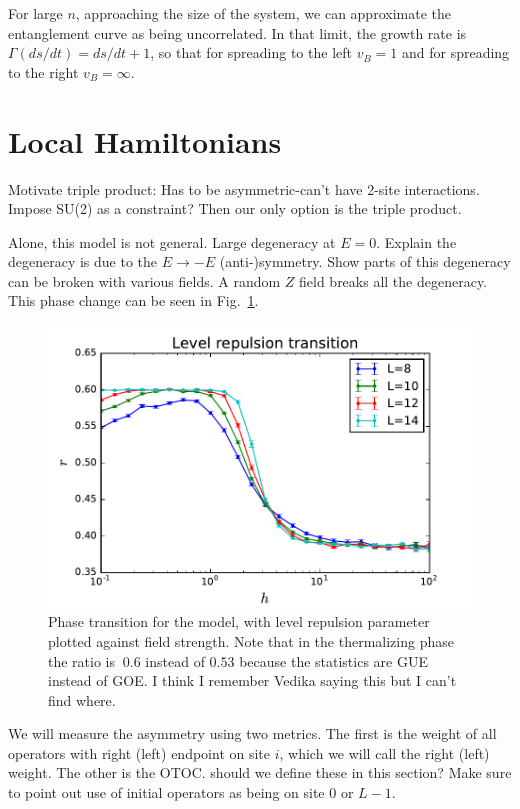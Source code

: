 \documentclass[aps,prl,reprint,superscriptaddress, longbibliography]{revtex4-1}
\newcommand{\charlie}[1]{ {\color{Magenta} {{#1}}}}
\begin{document}
For large $n$, approaching the size of the system, we can approximate the entanglement curve as being uncorrelated. In that limit, the growth rate is $\Gamma(ds/dt) = ds/dt+1$, so that for spreading to the left $v_B=1$ and for spreading to the right $v_B=\infty$.

\section{Local Hamiltonians}

Motivate triple product:
Has to be asymmetric-can't have 2-site interactions.
Impose SU(2) as a constraint?
Then our only option is the triple product.

Alone, this model is not general.
Large degeneracy at $E=0$. 
Explain the degeneracy is due to the $E\to -E$ (anti-)symmetry.
Show parts of this degeneracy can be broken with various fields.
A random $Z$ field breaks all the degeneracy.
This phase change can be seen in Fig.~\ref{fig:levelrepultrans}.

\begin{figure}
	\includegraphics[width=\columnwidth]{levelrepultrans}
	\caption{Phase transition for the model, with level repulsion parameter plotted against field strength. Note that in the thermalizing phase the ratio is $~0.6$ instead of $0.53$ because the statistics are GUE instead of GOE. \charlie{I think I remember Vedika saying this but I can't find where.}}
	\label{fig:levelrepultrans}
\end{figure}

We will measure the asymmetry using two metrics. The first is the weight of all operators with right (left) endpoint on site $i$, which we will call the right (left) weight. The other is the OTOC. \charlie{should we define these in this section?} \charlie{Make sure to point out use of initial operators as being on site 0 or $L-1$}.
\end{document}
